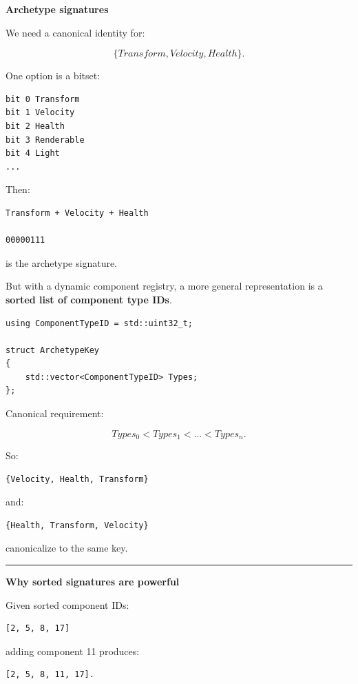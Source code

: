 \textbf{Archetype signatures}

We need a canonical identity for:

\[
\{Transform,Velocity,Health\}.
\]

One option is a bitset:

\begin{verbatim}
bit 0 Transform
bit 1 Velocity
bit 2 Health
bit 3 Renderable
bit 4 Light
...
\end{verbatim}

Then:

\begin{verbatim}
Transform + Velocity + Health

00000111
\end{verbatim}

is the archetype signature.

But with a dynamic component registry, a more general representation is a \textbf{sorted list of component type IDs}.

\begin{verbatim}
using ComponentTypeID = std::uint32_t;

struct ArchetypeKey
{
    std::vector<ComponentTypeID> Types;
};
\end{verbatim}

Canonical requirement:

\[
Types_0<Types_1<\dots<Types_n.
\]

So:

\begin{verbatim}
{Velocity, Health, Transform}
\end{verbatim}

and:

\begin{verbatim}
{Health, Transform, Velocity}
\end{verbatim}

canonicalize to the same key.

\begin{center}\rule{0.5\linewidth}{0.5pt}\end{center}

\textbf{Why sorted signatures are powerful}

Given sorted component IDs:

\begin{verbatim}
[2, 5, 8, 17]
\end{verbatim}

adding component 11 produces:

\begin{verbatim}
[2, 5, 8, 11, 17].
\end{verbatim}

